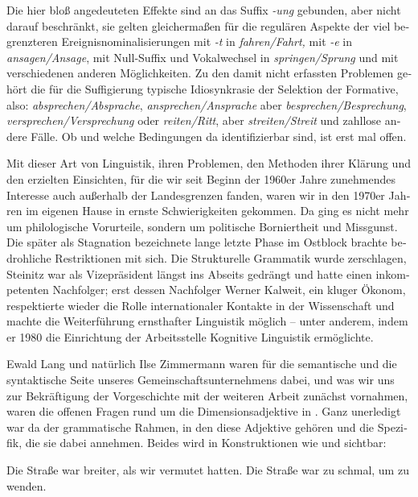 \documentclass[output=paper,colorlinks,citecolor=brown]{langscibook}
\begin{document}
\begin{otherlanguage}{german}
\noindent Die hier bloß angedeuteten Effekte sind an das Suffix \textit{-ung} gebunden, aber nicht darauf beschränkt, sie gelten gleichermaßen für die regulären Aspekte der viel begrenzteren Ereignisnominalisierungen mit \textit{-t} in \textit{fahren/Fahrt,} mit \textit{-e} in \textit{ansagen/Ansage}, mit Null-Suffix und Vokalwechsel in \textit{springen/Sprung} und mit verschiedenen anderen Möglichkeiten. Zu den damit nicht erfassten Problemen gehört die für die Suffigierung typische Idiosynkrasie der Selektion der Formative, also: \textit{absprechen/Absprache}, \textit{ansprechen/Ansprache} aber \textit{besprechen/Besprechung}, \textit{versprechen/Versprechung} oder \textit{reiten/Ritt}, aber \textit{streiten/Streit} und zahllose andere Fälle. Ob und welche Bedingungen da identifizierbar sind, ist erst mal offen.

Mit dieser Art von Linguistik, ihren Problemen, den Methoden ihrer Klärung und den erzielten Einsichten, für die wir seit Beginn der 1960er Jahre zunehmendes Interesse auch außerhalb der Landesgrenzen fanden, waren wir in den 1970er Jahren im eigenen Hause in ernste Schwierigkeiten gekommen. Da ging es nicht mehr um philologische Vorurteile, sondern um politische Borniertheit und Missgunst. Die später als Stagnation bezeichnete lange letzte Phase im Ostblock brachte bedrohliche Restriktionen mit sich. Die \glqq Strukturelle Grammatik\grqq{} wurde zerschlagen, Steinitz war als Vizepräsident längst ins Abseits gedrängt und hatte einen inkompetenten Nachfolger; erst dessen Nachfolger Werner Kalweit, ein kluger Ökonom, respektierte wieder die Rolle internationaler Kontakte in der Wissenschaft und machte die Weiterführung ernsthafter Linguistik möglich -- unter anderem, indem er 1980 die Einrichtung der \glqq Arbeitsstelle Kognitive Linguistik\grqq{} ermöglichte.

\label{sec:4}

Ewald Lang und natürlich Ilse Zimmermann waren für die semantische und die syntaktische Seite unseres Gemeinschaftsunternehmens \citep{BierwischLang1987} dabei, und was wir uns zur Bekräftigung der Vorgeschichte mit der weiteren Arbeit zunächst vornahmen, waren die offenen Fragen rund um die Dimensionsadjektive in . Ganz unerledigt war da der grammatische Rahmen, in den diese Adjektive gehören und die Spezifik, die sie dabei annehmen. Beides wird in Konstruktionen wie  und  sichtbar:

\ea
\ea Die Straße war breiter, als wir vermutet hatten. \label{ex:16a}
\ex Die Straße war zu schmal, um zu wenden. \label{ex:16b}
\z
\label{ex:16}
\z 


\end{otherlanguage}
\end{document}

